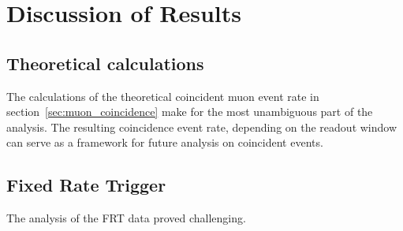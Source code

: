 \chapter{Discussion of Results}\label{chap:discussion}

\section{Theoretical calculations}
The calculations of the theoretical coincident muon event rate in section~\ref{sec:muon_coincidence} make for the most unambiguous part 
of the analysis. The resulting coincidence event rate, depending on the readout window can serve as a framework for future analysis on coincident events.

\section{Fixed Rate Trigger}
The analysis of the FRT data proved challenging. 